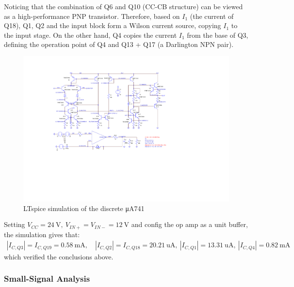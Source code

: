 \documentclass[UTF8]{article}
\begin{document}
Noticing that the combination of Q6 and Q10 (CC-CB structure) can be viewed as a high-performance PNP transistor. Therefore, based on $I_1$ (the current of Q18), Q1, Q2 and the input block form a Wilson current source, copying $I_1$ to the input stage. On the other hand, Q4 copies the current $I_1$ from the base of Q3, defining the operation point of Q4 and Q13 + Q17 (a Darlington NPN pair).
\begin{figure}[H]\centering
    \includegraphics[width=0.91\columnwidth]{LCE-06-07-运放设计/assets/uA741/uA741 LTspice.pdf}
    \caption{LTspice simulation of the discrete μA741}
    \label{LTspice uA741}
\end{figure}
\noindent 
Setting $V_{CC} = 24 \ \mathrm{V},\ V_{IN+} = V_{IN-} = 12 \ \mathrm{V}$ and config the op amp as a unit buffer, the simulation gives that:
\begin{gather}
    |I_{C,Q3}| = I_{C,Q19} = 0.58 \ \mathrm{mA},\quad 
    |I_{C,Q2}| = I_{C,Q18} = 20.21 \ \mathrm{uA},\ 
    |I_{C,Q1}| = 13.31 \ \mathrm{uA},\ 
    |I_{C,Q4}| = 0.82 \ \mathrm{mA}
\end{gather}
which verified the conclusions above.



\subsubsection{Small-Signal Analysis}
\end{document}
